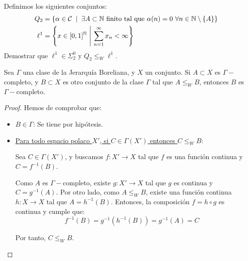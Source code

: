 \begin{ejercicio}
        Definimos los siguientes conjuntos:
        \begin{align*}
           Q_2 &= \left\{ \alpha \in \cc{C} \;\mid\; \exists A\subset \mathbb{N}\ \text{finito tal que}\ \alpha(n)=0\ \forall n\in \mathbb{N}\setminus\{A\}\right\} \\
           \ell^1 &= \left\{ x\in [0,1]^\mathbb{N}\ \middle|\ \sum_{n=1}^\infty x_n < \infty\right\}
        \end{align*}
        Demostrar que $\ell^1\in \Sigma_2^0$ y $Q_2 \leq_W \ell^1$.
    \end{ejercicio}

    \begin{ejercicio}
        Sea $\Gamma$ una clase de la Jerarquía Boreliana, y $X$ un conjunto. Si $A\subset X$ es $\Gamma-$completo, y $B\subset X$ es otro conjunto de la clase $\Gamma$ tal que $A\leq_W B$, entonces $B$ es $\Gamma-$completo.
        \begin{proof}
            Hemos de comprobar que:
        \begin{itemize}
            \item \ul{$B\in \Gamma$}: Se tiene por hipótesis.
            \item \ul{Para todo espacio polaco $X'$, si $C\in \Gamma(X')$ entonces $C\leq_W B$}:
            
            Sea $C\in \Gamma(X')$, y buscamos $f:X'\to X$ tal que $f$ es una función continua y $C=f^{-1}(B)$.
            
            Como $A$ es $\Gamma-$completo, existe $g:X'\to X$ tal que $g$ es continua y $C=g^{-1}(A)$. Por otro lado, como $A\leq_W B$, existe una función continua $h:X\to X$ tal que $A=h^{-1}(B)$. Entonces, la composición $f=h\circ g$ es continua y cumple que:
            \begin{equation*}
                f^{-1}(B) = g^{-1}(h^{-1}(B)) = g^{-1}(A) = C
            \end{equation*}

            Por tanto, $C\leq_W B$.
        \end{itemize}
        \end{proof}
    \end{ejercicio}


